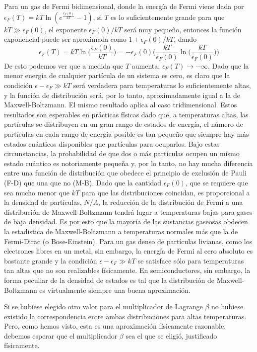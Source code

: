 \documentclass[12pt,a4paper]{article}
\def\e{{\epsilon}} %
\begin{document}
Para un gas de Fermi bidimensional, donde la energía de Fermi viene dada por $\e_{F}(T)=kT \ln (e^{\frac{e_{F}(0)}{kT}}-1)$, si $T$ es lo suficientemente grande para que $kT \gg \e_{F}(0)$, el exponente $\e_{F}(0)/kT$ será muy pequeño, entonces la función exponencial puede ser aproximada como $1+\e_{F}(0)/kT$, dando
\[ \e_{F}(T)=kT \ln \bigg( \frac{\e_{F}(0)}{kT} \bigg)= -\e_{F}(0) \bigg( \frac{kT}{\e_{F}(0)} \ln \bigg( \frac{kT}{\e_{F}(0)} \bigg) \bigg) \]
De esto podemos ver que a medida que $T$ aumenta, $\e_{F}(T) \rightarrow - \infty$. Dado que la menor energía de cualquier partícula de un sistema es cero, es claro que la condición $\e - \e_{F} \gg kT$ será verdadera para temperaturas lo suficientemente altas, y la función de distribución será, por lo tanto, aproximadamente igual a la de Maxwell-Boltzmann. El mismo resultado aplica al caso tridimensional. Estos resultados son esperables en prácticas físicas dado que, a temperaturas altas, las partículas se distribuyen en un gran rango de estados de energía, el número de partículas en cada rango de energía posible es tan pequeño que siempre hay más estados cuánticos disponibles que partículas para ocuparlos. Bajo estas circunstancias, la probabilidad de que dos o más partículas ocupen un mismo estado cuántico es notoriamente pequeña y, por lo tanto, no hay mucha diferencia entre una función de distribución que obedece el principio de exclusión de Pauli (F-D) que una que no (M-B). Dado que la cantidad $\e_{F}(0)$, que se requiere que sea mucho menor que $kT$ para que las distribuciones coincidan, es proporcional a la densidad de partículas, $N/A$, la reducción de la distribución de Fermi a una distribución de Maxwell-Boltzmann tendrá lugar a temperaturas bajas para gases de baja densidad. Es por esto que la mayoría de las sustancias gaseosas obdecen la estadística de Maxwell-Boltzmann a temperaturas normales más que la de Fermi-Dirac (o Bose-Einstein). Para un gas denso de partículas livianas, como los electrones libres en un metal, sin embargo, la energía de Fermi al cero absoluto es bastante grande y la condición $\e - \e_{F} \gg kT$ se satisface sólo para temperaturas tan altas que no son realizables físicamente. En semiconductores, sin embargo, la forma peculiar de la densidad de estados es tal que la distribución de Maxwell-Boltzmann es virtualmente siempre una buena aproximación.

Si se hubiese elegido otro valor para el multiplicador de Lagrange $\beta$ no hubiese existido la correspondencia entre ambas distribuciones para altas temperaturas. Pero, como hemos visto, esta es una aproximación físicamente razonable, debemos esperar que el multiplicador $\beta$ sea el que se eligió, justificado físicamente.
\end{document}
